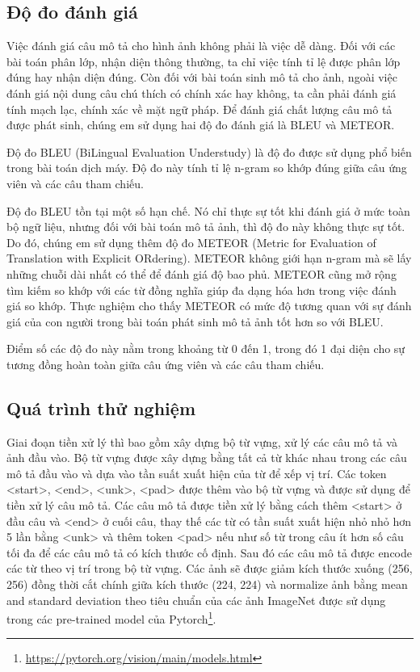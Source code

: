 \documentclass[conference]{IEEEtran}
\begin{document}
\subsection{Độ đo đánh giá}
Việc đánh giá câu mô tả cho hình ảnh không phải là việc dễ dàng. Đối với các bài toán phân lớp, nhận diện thông thường, ta chỉ việc tính tỉ lệ được phân lớp đúng hay nhận diện đúng. Còn đối với bài toán sinh mô tả cho ảnh, ngoài việc đánh giá nội dung câu chú thích có chính xác hay không, ta cần phải đánh giá tính mạch lạc, chính xác về mặt ngữ pháp. Để đánh giá chất lượng câu mô tả được phát sinh, chúng em sử dụng hai độ đo đánh giá là BLEU\cite{papineni2002bleu} và METEOR\cite{banerjee2005meteor}.

Độ đo BLEU (BiLingual Evaluation Understudy) là độ đo được sử dụng phổ biến trong bài toán dịch máy.
Độ đo này tính tỉ lệ n-gram so khớp đúng giữa câu ứng viên và các câu tham chiếu. 

Độ đo BLEU tồn tại một số hạn chế.
Nó chỉ thực sự tốt khi đánh giá ở mức toàn bộ ngữ liệu, nhưng đối với bài toán mô tả ảnh, thì độ đo này không thực sự tốt.
Do đó, chúng em sử dụng thêm độ đo METEOR  (Metric for Evaluation of Translation with Explicit ORdering).
METEOR không giới hạn n-gram mà sẽ lấy những chuỗi dài nhất có thể để đánh giá độ bao phủ.
METEOR cũng mở rộng tìm kiếm so khớp với các từ đồng nghĩa giúp đa dạng hóa hơn trong việc đánh giá so khớp.
Thực nghiệm cho thấy METEOR có mức độ tương quan với sự đánh giá của con người trong bài toán phát sinh mô tả ảnh tốt hơn so với BLEU.

Điểm số các độ đo này nằm trong khoảng từ 0 đến 1, trong đó 1 đại diện cho sự tương đồng hoàn toàn giữa câu ứng viên và các câu tham chiếu.

\subsection{Quá trình thử nghiệm\label{implement}}
Giai đoạn tiền xử lý thì bao gồm xây dựng bộ từ vựng, xử lý các câu mô tả và ảnh đầu vào. Bộ từ vựng được xây dựng bằng tất cả từ khác nhau trong các câu mô tả đầu vào và dựa vào tần suất xuất hiện của từ để xếp vị trí. Các token <start>, <end>, <unk>, <pad> được thêm vào bộ từ vựng và được sử dụng để tiền xử lý câu mô tả. Các câu mô tả được tiền xử lý bằng cách thêm <start> ở đầu câu và <end> ở cuối câu, thay thế các từ có tần suất xuất hiện nhỏ nhỏ hơn 5 lần bằng <unk> và thêm token <pad> nếu như số từ trong câu ít hơn số câu tối đa để các câu mô tả có kích thước cố định. Sau đó các câu mô tả được encode các từ theo vị trí trong bộ từ vựng. 
Các ảnh sẽ được giảm kích thước xuống (256, 256) đồng thời cắt chính giữa kích thước (224, 224) và normalize ảnh bằng mean and standard deviation theo tiêu chuẩn của các ảnh ImageNet được sử dụng trong các pre-trained model của Pytorch\footnote{\label{pytorch}\url{https://pytorch.org/vision/main/models.html}}.  
\end{document}
